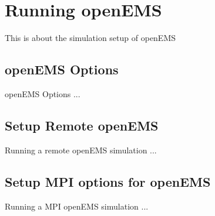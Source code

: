 \chapter{Running openEMS}
This is about the simulation setup of openEMS

\section{openEMS Options}
openEMS Options ...

\section{Setup Remote openEMS}
Running a remote openEMS simulation ...

\section{Setup MPI options for openEMS}
Running a MPI openEMS simulation ...

